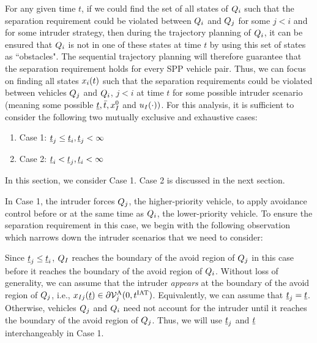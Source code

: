 For any given time $t$, if we could find the set of all states of $Q_i$ such that the separation requirement could be violated between $Q_i$ and $Q_j$ for some $j<i$ and for some intruder strategy, then during the trajectory planning of $Q_i$, it can be ensured that $Q_i$ is not in one of these states at time $t$ by using this set of states as ``obstacles". The sequential trajectory planning will therefore guarantee that the separation requirement holds for every SPP vehicle pair. Thus, we can focus on finding all states $x_i(t)$ such that the separation requirements could be violated between vehicles $Q_j$ and $Q_i$, $j <i$ at time $t$ for some possible intruder scenario (meaning some possible $\underline{t}, \bar{t}, x_{I}^0$ and $u_{I}(\cdot))$. For this analysis, it is sufficient to consider the following two mutually exclusive and exhaustive cases: 
\begin{enumerate}
\item Case 1: $\underline{t}_j \leq \underline{t}_i, \underline{t}_j < \infty$
\item Case 2: $\underline{t}_i < \underline{t}_j, \underline{t}_i <\infty$
\end{enumerate}
In this section, we consider Case 1. Case 2 is discussed in the next section.  

In Case 1, the intruder forces $Q_j$, the higher-priority vehicle, to apply avoidance control before or at the same time as $Q_i$, the lower-priority vehicle. %
To ensure the separation requirement in this case, we begin with the following observation which narrows down the intruder scenarios that we need to consider:
\begin{observation} \label{obs1_case1}
Since $\underline{t}_j \leq \underline{t}_i$, $Q_{I}$ reaches the boundary of the avoid region of $Q_j$ in this case before it reaches the boundary of the avoid region of $Q_i$. Without loss of generality, we can assume that the intruder \textit{appears} at the boundary of the avoid region of $Q_j$, i.e., $x_{I j}(\underline{t}) \in \partial \mathcal{V}^{\text{A}}_{j}(0, t^\text{IAT})$. Equivalently, we can assume that $\underline{t}_j = \underline{t}$. Otherwise, vehicles $Q_j$ and $Q_i$ need not account for the intruder until it reaches the boundary of the avoid region of $Q_j$. Thus, we will use $\underline{t}_j$ and $\underline{t}$ interchangeably in Case 1.
\end{observation}